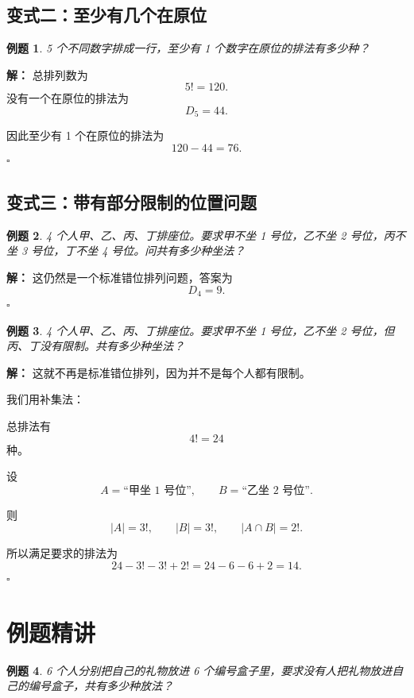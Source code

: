 \documentclass[11pt,a4paper,fontset=fandol]{ctexart}
\theoremstyle{formaltheorem}
\theoremstyle{formalexample}
\newtheorem{example}{例题}[section]
\newenvironment{solution}{\par\noindent\textbf{解：}}{\hfill$\square$\par}
\begin{document}
\subsection{变式二：至少有几个在原位}

\begin{example}
5 个不同数字排成一行，至少有 1 个数字在原位的排法有多少种？
\end{example}

\begin{solution}
总排列数为
\[
5!=120.
\]
没有一个在原位的排法为
\[
D_5=44.
\]

因此至少有 1 个在原位的排法为
\[
120-44=76.
\]
\end{solution}

\subsection{变式三：带有部分限制的位置问题}

\begin{example}
4 个人甲、乙、丙、丁排座位。要求甲不坐 1 号位，乙不坐 2 号位，丙不坐 3 号位，丁不坐 4 号位。问共有多少种坐法？
\end{example}

\begin{solution}
这仍然是一个标准错位排列问题，答案为
\[
D_4=9.
\]
\end{solution}

\begin{example}
4 个人甲、乙、丙、丁排座位。要求甲不坐 1 号位，乙不坐 2 号位，但丙、丁没有限制。共有多少种坐法？
\end{example}

\begin{solution}
这就不再是标准错位排列，因为并不是每个人都有限制。

我们用补集法：

总排法有
\[
4!=24
\]
种。

设
\[
A=\text{“甲坐 1 号位”},\qquad B=\text{“乙坐 2 号位”}.
\]

则
\[
|A|=3!,\qquad |B|=3!,\qquad |A\cap B|=2!.
\]

所以满足要求的排法为
\[
24-3!-3!+2!=24-6-6+2=14.
\]
\end{solution}

\section{例题精讲}

\begin{example}
6 个人分别把自己的礼物放进 6 个编号盒子里，要求没有人把礼物放进自己的编号盒子，共有多少种放法？
\end{example}
\end{document}
